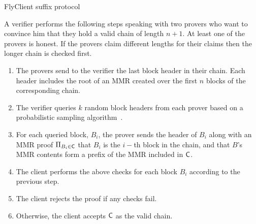 	\begin{algorithm}[h]
		\caption{\label{alg:flyclient_suffix_protocol}FlyClient suffix protocol~\cite{flyclient}}
		\begin{flushleft}
		A verifier performs the following steps speaking with two provers who want to convince him that they hold a valid chain of length $n+1$. At least one of the provers is honest. If the provers claim different lengths for their claims then the longer chain is checked first.
		\begin{enumerate}
			\item The provers send to the verifier the last block header in their chain. Each header includes the root of an MMR created over the first $n$ blocks of the corresponding chain.
			\item The verifier queries $k$ random block headers from each prover based on a probabilistic sampling algorithm~\cite{flyclient}.
			\item For each queried block, $B_i$, the prover sends the header of $B_i$ along with an MMR proof $\Pi_{B_i \in \mathsf{C}}$ that $B_i$ is the $i-$th block in the chain,
					  and that $B$'s MMR contents form a prefix of the MMR included in $\mathsf{C}$.
			\item The client performs the above checks for each block $B_i$ according to the previous step.
			\item The client rejects the proof if any checks fail.
			\item Otherwise, the client accepts $\mathsf{C}$ as the valid chain.
		\end{enumerate}
		\end{flushleft}
	\end{algorithm}

